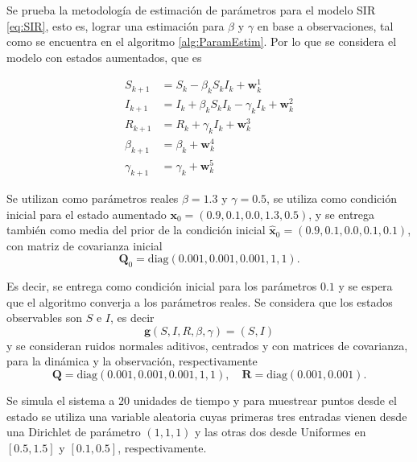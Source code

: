 Se prueba la metodología de estimación de parámetros para el modelo SIR \eqref{eq:SIR}, esto es, lograr una estimación para $\beta$ y $\gamma$ en base a observaciones, tal como se encuentra en el algoritmo \ref{alg:ParamEstim}. Por lo que se considera el modelo con estados aumentados, que es

\begin{equation*}
    \begin{aligned}
        S_{k+1} &= S_k - \beta_k S_k I_k + \mathbf{w}_k^1 \\
        I_{k+1} &= I_k + \beta_k S_k I_k - \gamma_k I_k + \mathbf{w}_k^2 \\
        R_{k+1} &= R_k + \gamma_k I_k + \mathbf{w}_k^3 \\
        \beta_{k+1} &= \beta_k + \mathbf{w}_k^4 \\
        \gamma_{k+1} &= \gamma_k + \mathbf{w}_k^5
    \end{aligned}
\end{equation*}

Se utilizan como parámetros reales $\beta=1.3$ y $\gamma=0.5$, se utiliza como condición inicial para el estado aumentado $\mathbf{x}_0 = (0.9, 0.1, 0.0, 1.3, 0.5)$, y se entrega también como media del prior de la condición inicial $\hat{\mathbf{x}}_0 = (0.9, 0.1, 0.0, 0.1, 0.1)$, con matriz de covarianza inicial
\begin{equation*}
    \mathbf{Q}_0 = \text{diag}(0.001, 0.001, 0.001, 1, 1).
\end{equation*}

Es decir, se entrega como condición inicial para los parámetros $0.1$ y se espera que el algoritmo converja a los parámetros reales. Se considera que los estados observables son $S$ e $I$, es decir
\begin{equation*}
    \mathbf{g}(S, I, R, \beta, \gamma) = (S, I)
\end{equation*}
y se consideran ruidos normales aditivos, centrados y con matrices de covarianza, para la dinámica y la observación, respectivamente
\begin{equation*}
    \mathbf{Q} = \text{diag}(0.001, 0.001, 0.001, 1, 1), \quad \mathbf{R} = \text{diag}(0.001, 0.001).
\end{equation*}

Se simula el sistema a $20$ unidades de tiempo y para muestrear puntos desde el estado se utiliza una variable aleatoria cuyas primeras tres entradas vienen desde una Dirichlet de parámetro $(1,1,1)$ y las otras dos desde Uniformes en $[0.5, 1.5]$ y $[0.1, 0.5]$, respectivamente. 

